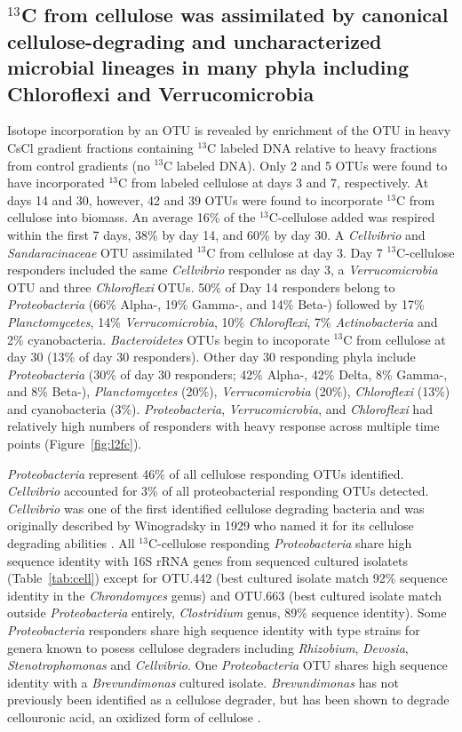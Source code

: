 \subsection{$^{13}$C from cellulose was assimilated by canonical
cellulose-degrading and uncharacterized microbial lineages in many phyla
including Chloroflexi and Verrucomicrobia} 
Isotope incorporation by an OTU is revealed by enrichment of the OTU in heavy
CsCl gradient fractions containing $^{13}$C labeled DNA relative to heavy
fractions from control gradients (no $^{13}$C labeled DNA). Only 2 and 5 OTUs
were found to have incorporated $^{13}$C from labeled cellulose at days 3 and
7, respectively. At days 14 and 30, however, 42 and 39
OTUs were found to incorporate $^{13}$C from cellulose into biomass. An average
16\% of the $^{13}$C-cellulose added was respired within the first 7 days, 38\%
by day 14, and 60\% by day 30. A \textit{Cellvibrio} and
\textit{Sandaracinaceae} OTU assimilated $^{13}$C from cellulose at day 3. Day
7 $^{13}$C-cellulose responders included the same \textit{Cellvibrio} responder as day 3, a
\textit{Verrucomicrobia} OTU and three \textit{Chloroflexi} OTUs. 50\% of Day
14 responders belong to \textit{Proteobacteria} (66\% Alpha-, 19\% Gamma-, and 14\%
Beta-) followed by 17\% \textit{Planctomycetes}, 14\% \textit{Verrucomicrobia},
10\% \textit{Chloroflexi}, 7\% \textit{Actinobacteria} and 2\%
cyanobacteria. \textit{Bacteroidetes} OTUs begin to incoporate
$^{13}$C from cellulose at day 30 (13\% of day 30 responders). Other day 30
responding phyla include \textit{Proteobacteria} (30\% of day 30 responders;
42\% Alpha-, 42\% Delta, 8\% Gamma-, and 8\% Beta-), \textit{Planctomycetes}
(20\%), \textit{Verrucomicrobia} (20\%), \textit{Chloroflexi} (13\%) and
cyanobacteria (3\%). \textit{Proteobacteria},
\textit{Verrucomicrobia}, and \textit{Chloroflexi} had relatively high numbers
of responders with heavy response across multiple time points
(Figure~\ref{fig:l2fc}).

\textit{Proteobacteria} represent 46\% of all cellulose responding OTUs
identified. \textit{Cellvibrio} accounted for 3\% of all proteobacterial
responding OTUs detected. \textit{Cellvibrio} was one of the first identified
cellulose degrading bacteria and was originally described by Winogradsky in
1929 who named it for its cellulose degrading abilities
\citep{boone2001bergeys}. All $^{13}$C-cellulose responding
\textit{Proteobacteria} share high sequence identity with 16S rRNA genes from
sequenced cultured isolatets (Table~\ref{tab:cell}) except for OTU.442 (best cultured
isolate match 92\% sequence identity in the \textit{Chrondomyces} genus) and
OTU.663 (best cultured isolate match outside \textit{Proteobacteria} entirely,
\textit{Clostridium} genus, 89\% sequence identity). Some
\textit{Proteobacteria} responders share high sequence identity with type
strains for genera known to posess cellulose degraders including
\textit{Rhizobium}, \textit{Devosia}, \textit{Stenotrophomonas} and
\textit{Cellvibrio}. One \textit{Proteobacteria} OTU shares high sequence
identity with a \textit{Brevundimonas} cultured isolate.
\textit{Brevundimonas} has not previously been identified as a cellulose
degrader, but has been shown to degrade cellouronic acid, an oxidized form of
cellulose \citep{Tavernier_2008}.

